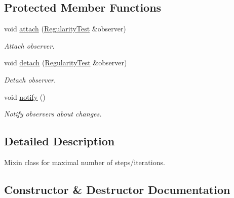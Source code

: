 \subsection*{Protected Member Functions}
\begin{DoxyCompactItemize}
\item 
\hypertarget{classSpacy_1_1Mixin_1_1MixinConnection_abb5520ee6b22dd993d78f142939a1ed4}{}void \hyperlink{classSpacy_1_1Mixin_1_1MixinConnection_abb5520ee6b22dd993d78f142939a1ed4}{attach} (\hyperlink{classSpacy_1_1Mixin_1_1RegularityTest}{Regularity\+Test} \&observer)\label{classSpacy_1_1Mixin_1_1MixinConnection_abb5520ee6b22dd993d78f142939a1ed4}

\begin{DoxyCompactList}\small\item\em Attach observer. \end{DoxyCompactList}\item 
\hypertarget{classSpacy_1_1Mixin_1_1MixinConnection_adda739590c487679c26f60e50aedb73f}{}void \hyperlink{classSpacy_1_1Mixin_1_1MixinConnection_adda739590c487679c26f60e50aedb73f}{detach} (\hyperlink{classSpacy_1_1Mixin_1_1RegularityTest}{Regularity\+Test} \&observer)\label{classSpacy_1_1Mixin_1_1MixinConnection_adda739590c487679c26f60e50aedb73f}

\begin{DoxyCompactList}\small\item\em Detach observer. \end{DoxyCompactList}\item 
\hypertarget{classSpacy_1_1Mixin_1_1MixinConnection_a1ddeaa78a3bb4a38c2cca36d1f99fe36}{}void \hyperlink{classSpacy_1_1Mixin_1_1MixinConnection_a1ddeaa78a3bb4a38c2cca36d1f99fe36}{notify} ()\label{classSpacy_1_1Mixin_1_1MixinConnection_a1ddeaa78a3bb4a38c2cca36d1f99fe36}

\begin{DoxyCompactList}\small\item\em Notify observers about changes. \end{DoxyCompactList}\end{DoxyCompactItemize}


\subsection{Detailed Description}
Mixin class for maximal number of steps/iterations. 

\subsection{Constructor \& Destructor Documentation}
\hypertarget{classSpacy_1_1Mixin_1_1RegularityTest_ae2887fec9a5bdd42239b3df6750bf2e9_ae2887fec9a5bdd42239b3df6750bf2e9}{}
